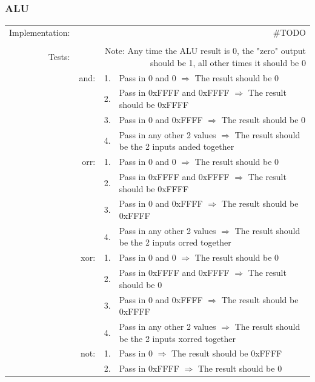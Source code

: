 \documentclass{article}
\begin{document}
		\subsubsection{ALU}
			\begin{longtable}{ r r r p{11cm} }
				Implementation: & \multicolumn{3}{p{12.75cm}}{\#TODO}\\ %
				                &      &    & \\
				         Tests: & \multicolumn{3}{p{12.75cm}}{Note:  Any time the ALU result is 0, the "zero" output should be 1, all other times it should be 0}\\
				                & and: & 1. & Pass in 0 and 0 $\Rightarrow$ The result should be 0\\
				                &      & 2. & Pass in 0xFFFF and 0xFFFF $\Rightarrow$ The result should be 0xFFFF\\
				                &      & 3. & Pass in 0 and 0xFFFF $\Rightarrow$ The result should be 0\\
				                &      & 4. & Pass in any other 2 values $\Rightarrow$ The result should be the 2 inputs anded together\\
				                & orr: & 1. & Pass in 0 and 0 $\Rightarrow$ The result should be 0\\
				                &      & 2. & Pass in 0xFFFF and 0xFFFF $\Rightarrow$ The result should be 0xFFFF\\
				                &      & 3. & Pass in 0 and 0xFFFF $\Rightarrow$ The result should be 0xFFFF\\
				                &      & 4. & Pass in any other 2 values $\Rightarrow$ The result should be the 2 inputs orred together\\
				                & xor: & 1. & Pass in 0 and 0 $\Rightarrow$ The result should be 0\\
				                &      & 2. & Pass in 0xFFFF and 0xFFFF $\Rightarrow$ The result should be 0\\
				                &      & 3. & Pass in 0 and 0xFFFF $\Rightarrow$ The result should be 0xFFFF\\
				                &      & 4. & Pass in any other 2 values $\Rightarrow$ The result should be the 2 inputs xorred together\\
				                & not: & 1. & Pass in 0 $\Rightarrow$ The result should be 0xFFFF\\
				                &      & 2. & Pass in 0xFFFF $\Rightarrow$ The result should be 0\\

\end{longtable}
\end{document}
